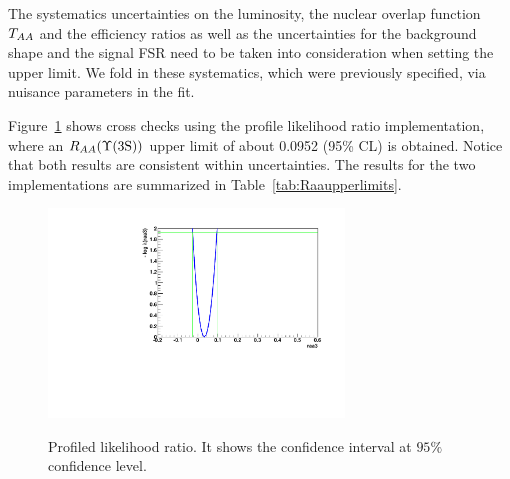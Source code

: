 

The systematics uncertainties on the \pp luminosity, the nuclear overlap function $T_{AA}$ and the efficiency ratios as well as the uncertainties for the background shape and the signal FSR need to be taken into consideration when setting the upper limit. We fold in these systematics, which were previously specified, via nuisance parameters in the fit.  


Figure~\ref{fig:plr_Raa3S_withSystematics} %
shows cross checks using the profile likelihood ratio implementation, where an $R_{AA}(\Upsilon\mathrm{(3S)})$ upper limit of about 0.0952 (95\% CL) is obtained. 
Notice that both results are consistent within uncertainties.  
The results for the two implementations are summarized in Table~\ref{tab:Raaupperlimits}.  

\begin{figure}[hbtp]
  \begin{center}
\includegraphics[angle=0,width=0.7\textwidth]{figures/limits//plr_Raa3S_withSystematics}\label{fig:/plr_Raa3S_withSystematics}
   \caption{Profiled likelihood ratio. %
It shows the confidence interval at $95\%$ confidence level.}
   \label{fig:plr_Raa3S_withSystematics}
 \end{center}
\end{figure}


